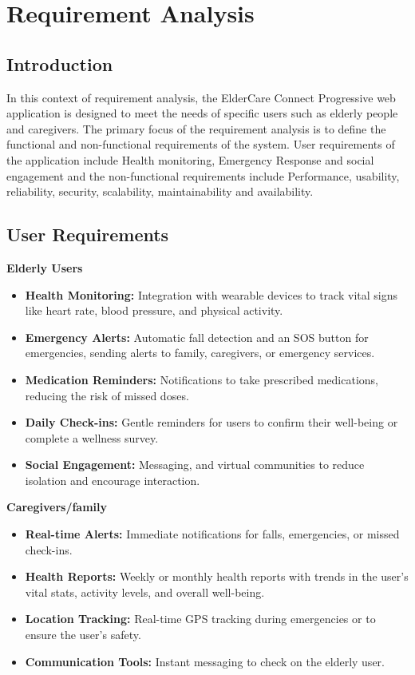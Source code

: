 \documentclass[a4paper, 12pt]{article}
\begin{document}
\section{\textbf{\LARGE Requirement Analysis}}
\subsection{\textbf{\Large Introduction}}
In this context of requirement analysis, the ElderCare Connect Progressive web application is designed to meet the needs of specific users such as elderly people and caregivers. The primary focus of the requirement analysis is to define the functional and non-functional requirements of the system. User requirements of the application include Health monitoring, Emergency Response and social engagement and  the non-functional requirements include Performance, usability, reliability, security, scalability, maintainability and availability.

\subsection{\Large User Requirements} 

\textbf{\large Elderly Users} 
\begin{itemize}
    \item \textbf{Health Monitoring:} Integration with wearable devices to track vital signs like heart rate, blood pressure, and physical activity. 
    \item \textbf{Emergency Alerts:} Automatic fall detection and an SOS button for emergencies, sending alerts to family, caregivers, or emergency services.
    \item \textbf{Medication Reminders:} Notifications to take prescribed medications, reducing the risk of missed doses. 
    \item \textbf{Daily Check-ins:} Gentle reminders for users to confirm their well-being or complete a wellness survey.
    \item \textbf{Social Engagement:} Messaging, and virtual communities to reduce isolation and encourage interaction.
\end{itemize}
\textbf{\large Caregivers/family} 
\begin{itemize}
    \item \textbf{Real-time Alerts:} Immediate notifications for falls, emergencies, or missed check-ins.
    \item \textbf{Health Reports:} Weekly or monthly health reports with trends in the user's vital stats, activity levels, and overall well-being.
    \item \textbf{Location Tracking:} Real-time GPS tracking during emergencies or to ensure the user's safety.
    \item \textbf{Communication Tools:} Instant messaging to check on the elderly user.
\end{itemize}
\end{document}
